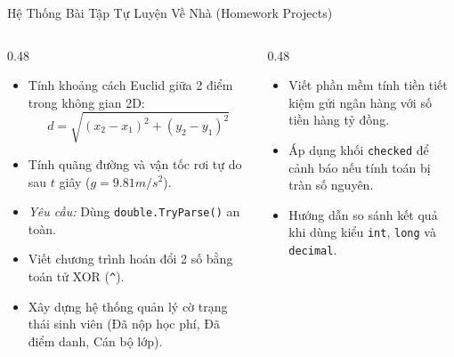 \documentclass[aspectratio=169, 10pt]{beamer}
\begin{document}
\begin{frame}{Hệ Thống Bài Tập Tự Luyện Về Nhà (Homework Projects)}
  \begin{columns}[T]
    \begin{column}{0.48\textwidth}
      \begin{tcolorbox}[colback=UniLightBlue!30,colframe=UniBlue,title=\textbf{Bài 1: Công thức Hình học \& Vật lý},fonttitle=\small\bfseries]
        \begin{itemize}\small
          \item Tính khoảng cách Euclid giữa 2 điểm trong không gian 2D:
            $$d = \sqrt{(x_2 - x_1)^2 + (y_2 - y_1)^2}$$
          \item Tính quãng đường và vận tốc rơi tự do sau $t$ giây ($g = 9.81 m/s^2$).
          \item \textit{Yêu cầu:} Dùng \texttt{double.TryParse()} an toàn.
        \end{itemize}
      \end{tcolorbox}

      \begin{tcolorbox}[colback=UniGreen!10,colframe=UniGreen,title=\textbf{Bài 2: Tối ưu Bitwise \& Flags},fonttitle=\small\bfseries]
        \begin{itemize}\small
          \item Viết chương trình hoán đổi 2 số bằng toán tử XOR (\texttt{\textasciicircum}).
          \item Xây dựng hệ thống quản lý cờ trạng thái sinh viên (Đã nộp học phí, Đã điểm danh, Cán bộ lớp).
        \end{itemize}
      \end{tcolorbox}
    \end{column}

    \begin{column}{0.48\textwidth}
      \begin{tcolorbox}[colback=CSharpPurple!10,colframe=CSharpPurple,title=\textbf{Bài 3: Tài chính \& Kiểm soát Tràn số},fonttitle=\small\bfseries]
        \begin{itemize}\small
          \item Viết phần mềm tính tiền tiết kiệm gửi ngân hàng với số tiền hàng tỷ đồng.
          \item Áp dụng khối \texttt{checked} để cảnh báo nếu tính toán bị tràn số nguyên.
          \item Hướng dẫn so sánh kết quả khi dùng kiểu \texttt{int}, \texttt{long} và \texttt{decimal}.
        \end{itemize}
      \end{tcolorbox}


\end{column}
\end{columns}
\end{frame}
\end{document}
